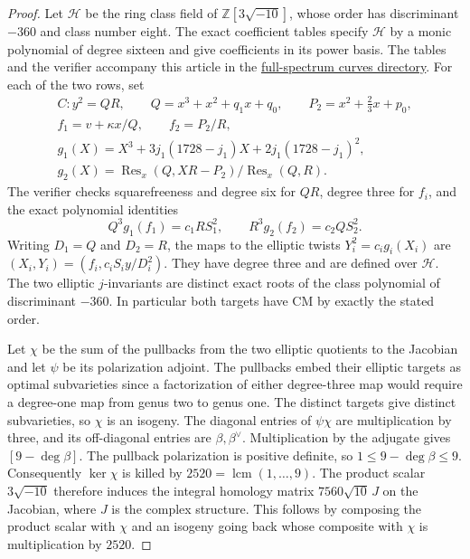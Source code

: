 \documentclass[11pt,letterpaper]{amsart}
\theoremstyle{definition}
\numberwithin{equation}{section}
\newcommand{\Z}{\mathbb Z}
\begin{document}
\begin{proof}
Let \(\mathcal H\) be the ring class field of
\(\Z[3\sqrt{-10}]\), whose order has discriminant \(-360\) and class
number eight. The exact coefficient tables specify \(\mathcal H\)
by a monic polynomial of degree sixteen and give coefficients in its
power basis. The tables and the verifier accompany this article in
the \href{https://github.com/towre676-cloud/crest-root-calculus/tree/main/research/elliptic-quotients/full-spectrum-curves}{full-spectrum curves directory}.
For each of the two rows, set
\[
 \begin{gathered}
 C\colon y^2=QR,\qquad Q=x^3+x^2+q_1x+q_0,\qquad
 P_2=x^2+\tfrac23 x+p_0,\\
 f_1=v+\kappa x/Q,\qquad f_2=P_2/R,\\
 g_1(X)=X^3+3j_1(1728-j_1)X+2j_1(1728-j_1)^2,\\
 g_2(X)=\operatorname{Res}_x(Q,XR-P_2)/\operatorname{Res}_x(Q,R).
 \end{gathered}
\]
The verifier checks squarefreeness and degree six for \(QR\),
degree three for \(f_i\), and the exact polynomial identities
\[
 Q^3g_1(f_1)=c_1RS_1^2,\qquad R^3g_2(f_2)=c_2QS_2^2 .
\]
Writing \(D_1=Q\) and \(D_2=R\), the maps to the elliptic twists
\(Y_i^2=c_i g_i(X_i)\) are \((X_i,Y_i)=(f_i,c_iS_i y/D_i^2)\).
They have degree three and are defined over \(\mathcal H\). The two
elliptic \(j\)-invariants are distinct exact roots of the class
polynomial of discriminant \(-360\). In particular both targets
have CM by exactly the stated order.

Let \(\chi\) be the sum of the pullbacks from the two elliptic
quotients to the Jacobian and let \(\psi\) be its polarization
adjoint. The pullbacks embed their elliptic targets as optimal
subvarieties since a factorization of either degree-three map
would require a degree-one map from genus two to genus one. The
distinct targets give distinct subvarieties, so \(\chi\) is an
isogeny. The diagonal entries of \(\psi\chi\) are multiplication
by three, and its off-diagonal entries are \(\beta,\beta^\vee\).
Multiplication by the adjugate gives \([9-\deg\beta]\). The
pullback polarization is positive definite, so
\(1\le9-\deg\beta\le9\). Consequently \(\ker\chi\) is killed by
\(2520=\operatorname{lcm}(1,\ldots,9)\). The product scalar
\(3\sqrt{-10}\) therefore induces the integral homology matrix
\(7560\sqrt{10}\,J\) on the Jacobian, where \(J\) is the complex
structure. This follows by composing the product scalar with
\(\chi\) and an isogeny going back whose composite with \(\chi\)
is multiplication by \(2520\).


\end{proof}
\end{document}
